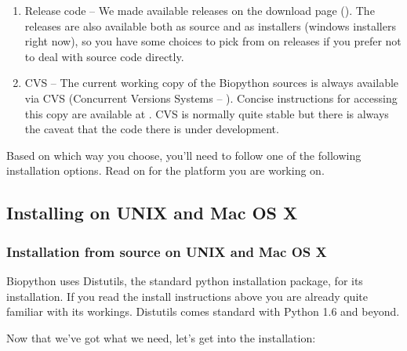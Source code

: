 \documentclass{article}
\begin{document}
\begin{enumerate}

\item Release code -- We made available releases on the download page 
(). 
The releases are also available both as source and as installers 
(windows installers right now), so you have some choices to pick from 
on releases if you prefer not to deal with source code directly.

\item CVS -- The current working copy of the Biopython sources is always
available via CVS (Concurrent Versions Systems --
). Concise instructions for
accessing this copy are available at
. CVS is normally quite stable
but there is always the caveat that the code there is under
development.

\end{enumerate}

Based on which way you choose, you'll need to follow one of the following installation options. Read on for the platform you are working on.

\subsection{Installing on UNIX and Mac OS X}
\label{sec:unix_install}

\subsubsection{Installation from source on UNIX and Mac OS X}

Biopython uses Distutils, the standard python installation package, for
its installation. If you read the install instructions above you are
already quite familiar with its workings. Distutils comes standard with 
Python 1.6 and beyond.

Now that we've got what we need, let's get into the installation:
\end{document}
